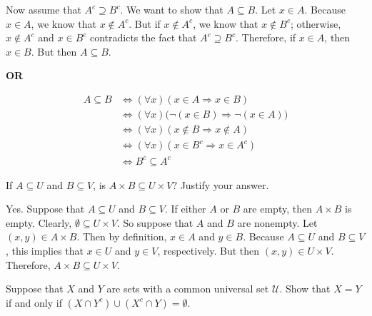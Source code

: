 \documentclass[11pt,letterpaper]{article}
\begin{document}
\begin{enumerate}[(a)]
Now assume that $A^c \supseteq B^c$. We want to show that $A \subseteq B$. Let $x \in A$. Because $x \in A$, we know that $x \notin A^c$. But if $x \notin A^c$, we know that $x \notin B^c$; otherwise, $x \notin A^c$ and $x \in B^c$ contradicts the fact that $A^c \supseteq B^c$. Therefore, if $x \in A$, then $x \in B$. But then $A \subseteq B$. 

\begin{center} {\bfseries OR} \end{center}

	\[
	\begin{aligned}
	A \subseteq B&\Longleftrightarrow (\forall x)( x \in A \Rightarrow x \in B) \\
	&\Longleftrightarrow (\forall x) \big( \neg(x \in B) \Rightarrow \neg(x \in A) \big) \\
	&\Longleftrightarrow (\forall x) ( x \notin B \Rightarrow x \notin A) \\
	&\Longleftrightarrow (\forall x) (x \in B^c \Rightarrow x \in A^c) \\
	&\Longleftrightarrow B^c \subseteq A^c
	\end{aligned}
	\]
\end{enumerate}





\newpage





 If $A \subseteq U$ and $B \subseteq V$, is $A \times B \subseteq U \times V$? Justify your answer. \pspace

\sol Yes. Suppose that $A \subseteq U$ and $B \subseteq V$. If either $A$ or $B$ are empty, then $A \times B$ is empty. Clearly, $\emptyset \subseteq U \times V$. So suppose that $A$ and $B$ are nonempty. Let $(x, y) \in A \times B$. Then by definition, $x \in A$ and $y \in B$. Because $A \subseteq U$ and $B \subseteq V$, this implies that $x \in U$ and $y \in V$, respectively. But then $(x, y) \in U \times V$. Therefore, $A \times B \subseteq U \times V$. 





\newpage





 Suppose that $X$ and $Y$ are sets with a common universal set $\mathscr{U}$. Show that $X= Y$ if and only if $(X \cap Y^c) \cup (X^c \cap Y)= \emptyset$. \pspace
\end{document}
